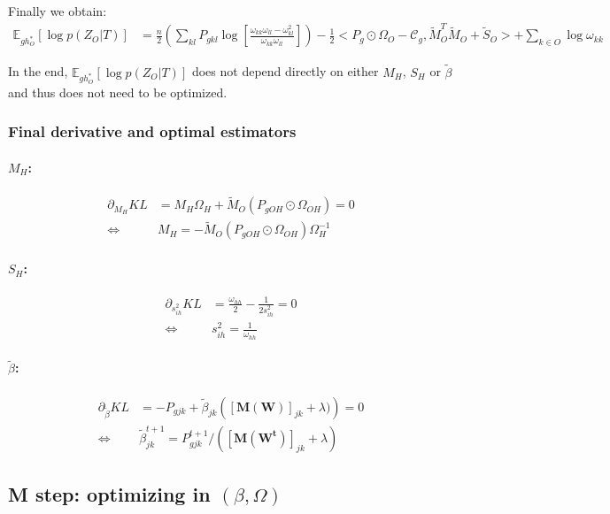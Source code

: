 \documentclass[11pt,a4paper]{article}
\newcommand{\Esp}{\mathds{E}}
\begin{document}
Finally we obtain:
\begin{align*}
 \Esp_{gh_O^*}[\log p(Z_O|T)] &= \frac{n}{2} \left(\sum _{kl} P_{gkl}  \log\left[\frac{\omega_{kk}\omega_{ll}-\omega_{kl}^2}{\omega_{kk}\omega_{ll}}\right]\right) - \frac{1}{2}< P_g \odot \Omega_O - \mathcal{C}_g, \widetilde{M}_O^T\widetilde{M}_O + \widetilde{S}_O> +\sum_{k\in O} \log \omega_{kk}
\end{align*}

In the end, $\Esp_{gh_O^*}[\log p(Z_O|T)]$ does not depend directly on either $M_H$, $S_H$ or $\widetilde{\beta}$ and thus does not need to be optimized.

\subsubsection{Final derivative and optimal estimators}
\paragraph{$M_H$:}
\begin{align*}
\partial_{M_H} KL &= M_H\Omega_H  + \widetilde{M}_O(P_{gOH}\odot\Omega_{OH}) =0\\
\iff& M_H =- \widetilde{M}_O(P_{gOH}\odot\Omega_{OH})\Omega_H^{-1}
\end{align*}
\paragraph{$S_H$:}
\begin{align*}
\partial_{s_{ih}^2} KL &=  \frac{\omega_{hh}}{2}- \frac{1}{2s_{ih}^2} = 0\\
\iff & s_{ih}^2 = \frac{1}{\omega_{hh}}
\end{align*}
\paragraph{$\widetilde{\beta}$:}
\begin{align*}
\partial_{\widetilde{\beta}} KL &= -P_{gjk}+\widetilde{\beta}_{jk} \left( [\bm{M}(\bm{W})]_{jk} + \lambda)\right) =0\\
\iff & \widetilde{\beta}_{jk}^{t+1} = P_{gjk}^{t+1}/\left([\bm{M}(\bm{W^t})]_{jk} + \lambda\right)
\end{align*}
 
\subsection{M step: optimizing in $(\beta, \Omega)$}
 
\end{document}
